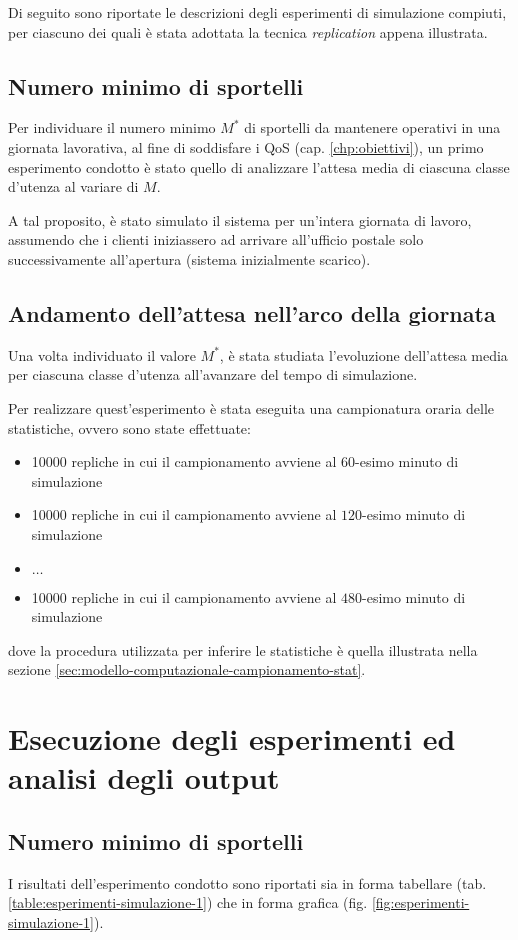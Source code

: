 Di seguito sono riportate le descrizioni degli esperimenti di simulazione compiuti, per ciascuno dei quali è stata adottata la tecnica \textit{replication} appena illustrata.

\subsection*{Numero minimo di sportelli}
Per individuare il numero minimo $M^*$ di sportelli da mantenere operativi in una giornata lavorativa, al fine di soddisfare i QoS (cap. \ref{chp:obiettivi}), un primo esperimento condotto è stato quello di analizzare l'attesa media di ciascuna classe d'utenza al variare di $M$.

A tal proposito, è stato simulato il sistema per un'intera giornata di lavoro, assumendo che i clienti iniziassero ad arrivare all'ufficio postale solo successivamente all'apertura (sistema inizialmente scarico).

\subsection*{Andamento dell'attesa nell'arco della giornata}
Una volta individuato il valore $M^*$, è stata studiata l'evoluzione dell'attesa media per ciascuna classe d'utenza all'avanzare del tempo di simulazione.

Per realizzare quest'esperimento è stata eseguita una campionatura oraria delle statistiche, ovvero sono state effettuate:
\begin{itemize}
\item 10000 repliche in cui il campionamento avviene al $60$-esimo minuto di simulazione
\item 10000 repliche in cui il campionamento avviene al $120$-esimo minuto di simulazione
\item $\dots$
\item 10000 repliche in cui il campionamento avviene al $480$-esimo minuto di simulazione
\end{itemize}
dove la procedura utilizzata per inferire le statistiche è quella illustrata nella sezione \ref{sec:modello-computazionale-campionamento-stat}.
	
\section{Esecuzione degli esperimenti ed analisi degli output}
\subsection*{Numero minimo di sportelli}
I risultati dell'esperimento condotto sono riportati sia in forma tabellare (tab. \ref{table:esperimenti-simulazione-1}) che in forma grafica (fig. \ref{fig:esperimenti-simulazione-1}).

